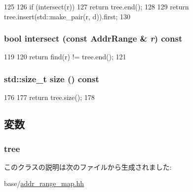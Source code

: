 \begin{DoxyCode}
125     {
126         if (intersect(r))
127             return tree.end();
128 
129         return tree.insert(std::make_pair(r, d)).first;
130     }
\end{DoxyCode}
\hypertarget{classAddrRangeMap_a94d6423eb2588b05dd2b7522a5fd0d66}{
\subsubsection[{intersect}]{\setlength{\rightskip}{0pt plus 5cm}bool intersect (const {\bf AddrRange} \& {\em r}) const}}
\label{classAddrRangeMap_a94d6423eb2588b05dd2b7522a5fd0d66}



\begin{DoxyCode}
119     {
120         return find(r) != tree.end();
121     }
\end{DoxyCode}
\hypertarget{classAddrRangeMap_a725e764d8ff6e3008f4494b38b7edca0}{
\subsubsection[{size}]{\setlength{\rightskip}{0pt plus 5cm}std::size\_\-t size () const}}
\label{classAddrRangeMap_a725e764d8ff6e3008f4494b38b7edca0}



\begin{DoxyCode}
176     {
177         return tree.size();
178     }
\end{DoxyCode}


\subsection{変数}
\hypertarget{classAddrRangeMap_a3a72c569864f92e88af53d780f71ceac}{
\subsubsection[{tree}]{ {\bf tree}}}
\label{classAddrRangeMap_a3a72c569864f92e88af53d780f71ceac}


このクラスの説明は次のファイルから生成されました:\begin{DoxyCompactItemize}
\item 
base/\hyperlink{addr__range__map_8hh}{addr\_\-range\_\-map.hh}\end{DoxyCompactItemize}
